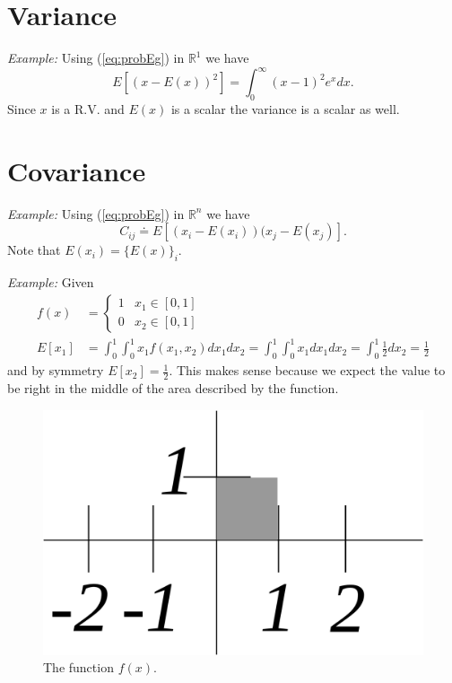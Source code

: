 \documentclass[lecture,12pt,]{pcms-l}
\begin{document}
\section{Variance}
\textit{Example:} Using (\ref{eq:probEg}) in $\mathbb{R}^1$ we have
$$E[(x - E(x))^2] = \int_0^\infty (x-1)^2e^xdx.$$
Since $x$ is a R.V. and $E(x)$ is a scalar the variance is a scalar as well.

\section{Covariance}
\textit{Example:} Using (\ref{eq:probEg}) in $\mathbb{R}^n$ we have $$C_{ij} \doteq E[(x_i - E(x_i))(x_j - E(x_j)].$$ Note that $E(x_i) = \lbrace E(x) \rbrace_i$.

\textit{Example:} Given
\begin{align*}
f(x) &= \begin{cases} 1 & x_1 \in [0,1] \\ 0 & x_2 \in [0,1] \end{cases} \\
E[x_1] &= \int_0^1 \int_0^1 x_1f(x_1,x_2)dx_1dx_2 = \int_0^1 \int_0^1 x_1dx_1dx_2 = \int_0^1 \frac{1}{2}dx_2 = \frac{1}{2}
\end{align*}
and by symmetry $E[x_2] = \frac{1}{2}$. This makes sense because we expect the value to be right in the middle of the area described by the function.
\begin{figure}[ht!]
	\centering
	\includegraphics[width=.45\textwidth]{images/01box}
	\caption{The function $f(x)$.}
	\label{fig:01box}
\end{figure}
\end{document}
